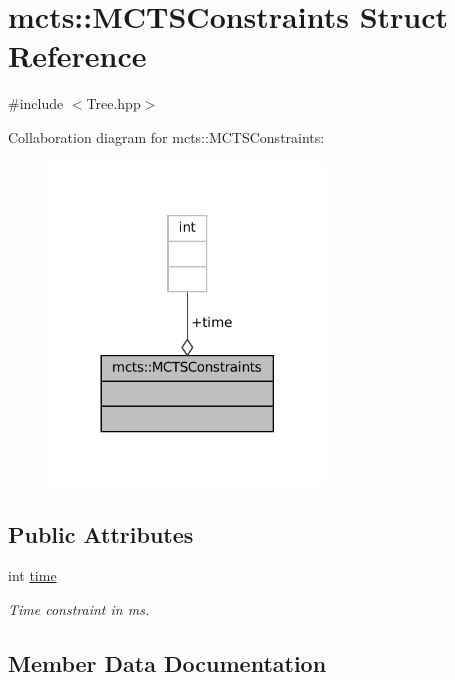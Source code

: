 \hypertarget{structmcts_1_1_m_c_t_s_constraints}{}\section{mcts\+:\+:M\+C\+T\+S\+Constraints Struct Reference}
\label{structmcts_1_1_m_c_t_s_constraints}


{\ttfamily \#include $<$Tree.\+hpp$>$}



Collaboration diagram for mcts\+:\+:M\+C\+T\+S\+Constraints\+:
\nopagebreak
\begin{figure}[H]
\begin{center}
\leavevmode
\includegraphics[width=209pt]{structmcts_1_1_m_c_t_s_constraints__coll__graph}
\end{center}
\end{figure}
\subsection*{Public Attributes}
\begin{DoxyCompactItemize}
\item 
int \hyperlink{structmcts_1_1_m_c_t_s_constraints_aedf1db5372623bd85445ce1af6dd2b91}{time}
\begin{DoxyCompactList}\small\item\em Time constraint in ms. \end{DoxyCompactList}\end{DoxyCompactItemize}


\subsection{Member Data Documentation}
\mbox{\label{structmcts_1_1_m_c_t_s_constraints_aedf1db5372623bd85445ce1af6dd2b91}} 

